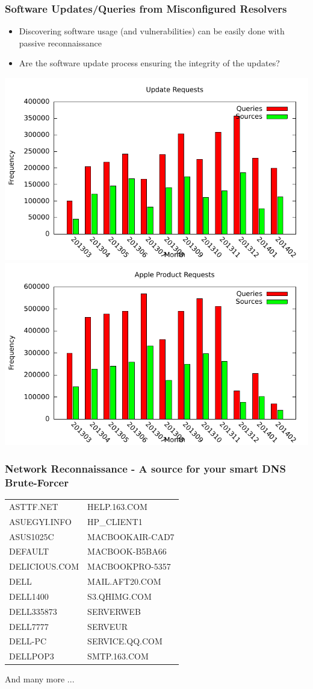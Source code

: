 \documentclass{beamer}
\begin{document}
\begin{frame}
\frametitle{Software Updates/Queries from Misconfigured Resolvers}
\begin{itemize}
\item Discovering software usage (and vulnerabilities) can be easily done with passive reconnaissance
\item Are the software update process ensuring the integrity of the updates?
\end{itemize}
\includegraphics[scale=0.4]{update.pdf}
\includegraphics[scale=0.4]{apple.pdf}
\end{frame}


\begin{frame}
\frametitle{Network Reconnaissance - A source for your smart DNS Brute-Forcer}
\begin{tabular}{ll}
ASTTF.NET & HELP.163.COM\\
ASUEGYI.INFO & HP\_CLIENT1\\
ASUS1025C& MACBOOKAIR-CAD7\\
DEFAULT& MACBOOK-B5BA66\\
DELICIOUS.COM& MACBOOKPRO-5357\\
DELL& MAIL.AFT20.COM\\
DELL1400& S3.QHIMG.COM\\
DELL335873&SERVERWEB\\
DELL7777&SERVEUR\\
DELL-PC&SERVICE.QQ.COM\\
DELLPOP3&SMTP.163.COM\\
\end{tabular}
And many more ...
\end{frame}
\end{document}
